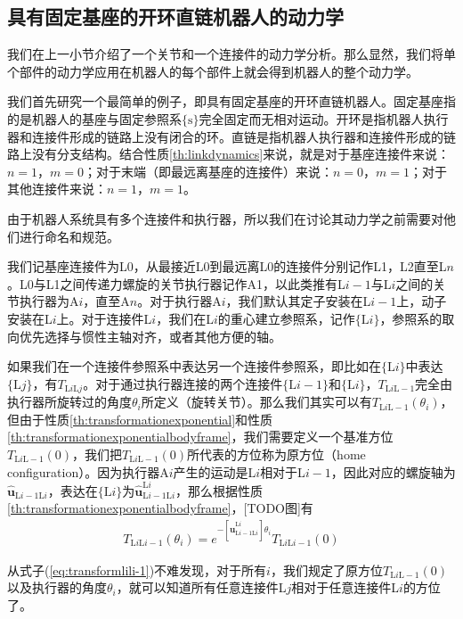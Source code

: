 \documentclass[12pt, a4paper, article, UTF8]{ctexart}
\begin{document}
\subsection{具有固定基座的开环直链机器人的动力学}
我们在上一小节介绍了一个关节和一个连接件的动力学分析。那么显然，我们将单个部件的动力学应用在机器人的每个部件上就会得到机器人的整个动力学。

我们首先研究一个最简单的例子，即具有固定基座的开环直链机器人。固定基座指的是机器人的基座与固定参照系$\{\text{s}\}$完全固定而无相对运动。开环是指机器人执行器和连接件形成的链路上没有闭合的环。直链是指机器人执行器和连接件形成的链路上没有分支结构。结合性质\ref{th:linkdynamics}来说，就是对于基座连接件来说：$n=1$，$m=0$；对于末端（即最远离基座的连接件）来说：$n=0$，$m=1$；对于其他连接件来说：$n=1$，$m=1$。

由于机器人系统具有多个连接件和执行器，所以我们在讨论其动力学之前需要对他们进行命名和规范。

我们记基座连接件为L0，从最接近L0到最远离L0的连接件分别记作L1，L2直至L$n$。L0与L1之间传递力螺旋的关节执行器记作A1，以此类推有L$i-1$与L$i$之间的关节执行器为A$i$，直至A$n$。对于执行器A$i$，我们默认其定子安装在L$i-1$上，动子安装在L$i$上。对于连接件L$i$，我们在L$i$的重心建立参照系，记作$\{\text{L}i\}$，参照系的取向优先选择与惯性主轴对齐，或者其他方便的轴。

如果我们在一个连接件参照系中表达另一个连接件参照系，即比如在$\{\text{L}i\}$中表达$\{\text{L}j\}$，有$T_{\text{L}i\text{L}j}$。对于通过执行器连接的两个连接件$\{\text{L}i-1\}$和$\{\text{L}i\}$，$T_{\text{L}i\text{L}-1}$完全由执行器所旋转过的角度$\theta_i$所定义（旋转关节）。那么我们其实可以有$T_{\text{L}i\text{L}-1}(\theta_i)$，但由于性质\ref{th:transformationexponential}和性质\ref{th:transformationexponentialbodyframe}，我们需要定义一个基准方位$T_{\text{L}i\text{L}-1}(0)$，我们把$T_{\text{L}i\text{L}-1}(0)$所代表的方位称为原方位（home configuration）。因为执行器A$i$产生的运动是L$i$相对于L$i-1$，因此对应的螺旋轴为$\hat{\mathbf{u}}_{\text{L}i-1\text{L}i}$，表达在$\{\text{L}i\}$为$\hat{\mathbf{u}}_{\text{L}i-1\text{L}i}^{\text{L}i}$，那么根据性质\ref{th:transformationexponentialbodyframe}，[TODO图]有
\begin{align}
T_{\text{L}i\text{L}i-1}(\theta_i) =e^{-[\hat{\mathbf{u}}_{\text{L}i-1\text{L}i}^{\text{L}i}] \theta_i} T_{\text{L}i\text{L}i-1}(0)  \label{eq:transformlili-1}
\end{align}

从式子(\ref{eq:transformlili-1})不难发现，对于所有$i$，我们规定了原方位$T_{\text{L}i\text{L}-1}(0)$以及执行器的角度$\theta_i$，就可以知道所有任意连接件L$j$相对于任意连接件L$i$的方位了。
\end{document}
